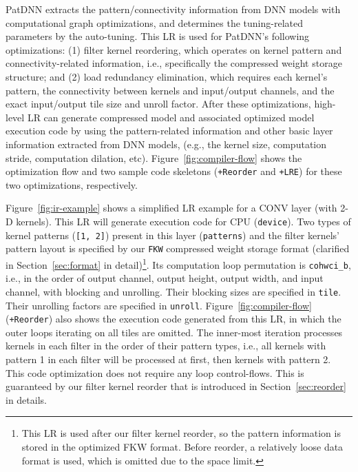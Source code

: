 \documentclass[sigplan,screen]{acmart}
\newcommand{\projectname}{PatDNN\xspace}
\begin{document}
\projectname extracts the pattern/connectivity information from DNN models with computational graph optimizations, and determines the tuning-related
parameters by the auto-tuning. 
This LR is used for \projectname's following optimizations:
(1) filter kernel reordering, which operates
on kernel pattern and connectivity-related 
information, i.e., specifically the compressed weight storage structure;  
and (2) load redundancy elimination, which
requires each kernel's pattern, the connectivity between kernels and input/output channels, and the exact input/output tile size and unroll factor. After these optimizations, high-level LR 
can generate compressed model and associated optimized model execution code by using the pattern-related information and other basic layer information extracted from DNN models, (e.g., the kernel size, computation stride, computation dilation, etc).
Figure~\ref{fig:compiler-flow} shows the optimization flow and two sample code skeletons ({\tt +Reorder} and {\tt +LRE}) for these two optimizations, respectively.





Figure~\ref{fig:ir-example} shows a simplified LR example for a CONV layer (with 2-D kernels). This LR will generate execution code for CPU ({\tt device}). Two types of kernel patterns ({\tt [1, 2]}) present in this layer ({\tt patterns}) and the filter kernels' pattern layout is specified by our {\tt FKW} compressed weight storage format (clarified in Section~\ref{sec:format} in detail)\footnote{This LR is used after our filter kernel reorder, so the pattern information is stored in the optimized FKW format. Before reorder, a relatively loose data format is used, which is omitted due to the space limit.}. Its computation loop permutation is {\tt cohwci\_b}, i.e., in the order of output channel, output height, output width, and input channel, with blocking and unrolling. Their blocking sizes are specified in {\tt tile}. Their unrolling factors are specified in {\tt unroll}.  Figure~\ref{fig:compiler-flow} ({\tt +Reorder}) also shows the execution code generated from this LR, in which the outer loops iterating on all tiles are omitted. The inner-most iteration processes kernels in each filter in the order of their pattern types, i.e., all kernels with pattern 1 in each filter will be processed at first, then kernels with pattern 2. This code optimization does not require any loop control-flows. This is guaranteed by our filter kernel reorder that is introduced in Section~\ref{sec:reorder} in details.
\end{document}
